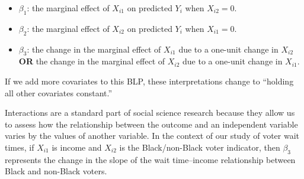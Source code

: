 \documentclass[
  13pt,
  letterpaper,
  DIV=11,
  numbers=noendperiod]{scrreprt}
\providecommand{\tightlist}{%
  \setlength{\itemsep}{0pt}\setlength{\parskip}{0pt}}
\theoremstyle{plain}
\theoremstyle{plain}
\theoremstyle{definition}
\theoremstyle{definition}
\theoremstyle{remark}
\begin{document}
\begin{itemize}
\tightlist
\item
  \(\beta_1\): the marginal effect of \(X_{i1}\) on predicted \(Y_i\)
  when \(X_{i2} = 0\).
\item
  \(\beta_2\): the marginal effect of \(X_{i2}\) on predicted \(Y_i\)
  when \(X_{i1} = 0\).
\item
  \(\beta_3\): the change in the marginal effect of \(X_{i1}\) due to a
  one-unit change in \(X_{i2}\) \textbf{OR} the change in the marginal
  effect of \(X_{i2}\) due to a one-unit change in \(X_{i1}\).
\end{itemize}

If we add more covariates to this BLP, these interpretations change to
``holding all other covariates constant.''

Interactions are a standard part of social science research because they
allow us to assess how the relationship between the outcome and an
independent variable varies by the values of another variable. In the
context of our study of voter wait times, if \(X_{i1}\) is income and
\(X_{i2}\) is the Black/non-Black voter indicator, then \(\beta_3\)
represents the change in the slope of the wait time--income relationship
between Black and non-Black voters.
\end{document}
